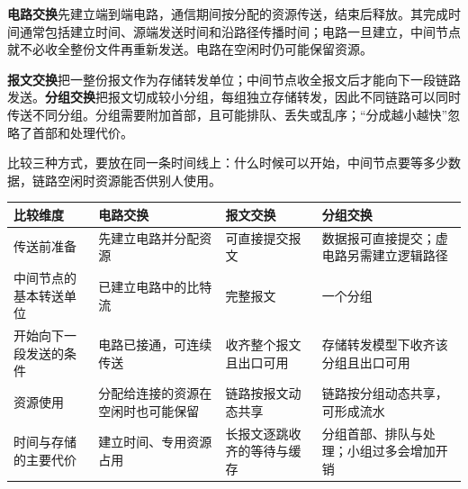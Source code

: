 \textbf{电路交换}先建立端到端电路，通信期间按分配的资源传送，结束后释放。其完成时间通常包括建立时间、源端发送时间和沿路径传播时间；电路一旦建立，中间节点就不必收全整份文件再重新发送。电路在空闲时仍可能保留资源。

\textbf{报文交换}把一整份报文作为存储转发单位；中间节点收全报文后才能向下一段链路发送。\textbf{分组交换}把报文切成较小分组，每组独立存储转发，因此不同链路可以同时传送不同分组。分组需要附加首部，且可能排队、丢失或乱序；``分成越小越快''忽略了首部和处理代价。

比较三种方式，要放在同一条时间线上：什么时候可以开始，中间节点要等多少数据，链路空闲时资源能否供别人使用。

\begin{wideblock}

\par\medskip\noindent\begin{minipage}{\linewidth}\fontsize{9.3}{12}\selectfont\begin{tabularx}{\linewidth}{@{}YYYY@{}}
\toprule\noalign{}
\begin{minipage}[b]{\linewidth}\raggedright
比较维度
\end{minipage} & \begin{minipage}[b]{\linewidth}\raggedright
电路交换
\end{minipage} & \begin{minipage}[b]{\linewidth}\raggedright
报文交换
\end{minipage} & \begin{minipage}[b]{\linewidth}\raggedright
分组交换
\end{minipage} \\
\midrule\noalign{}


传送前准备 & 先建立电路并分配资源 & 可直接提交报文 & 数据报可直接提交；虚电路另需建立逻辑路径 \\
中间节点的基本转送单位 & 已建立电路中的比特流 & 完整报文 & 一个分组 \\
开始向下一段发送的条件 & 电路已接通，可连续传送 & 收齐整个报文且出口可用 & 存储转发模型下收齐该分组且出口可用 \\
资源使用 & 分配给连接的资源在空闲时也可能保留 & 链路按报文动态共享 & 链路按分组动态共享，可形成流水 \\
时间与存储的主要代价 & 建立时间、专用资源占用 & 长报文逐跳收齐的等待与缓存 & 分组首部、排队与处理；小组过多会增加开销 \\
\bottomrule\end{tabularx}
\end{minipage}\par\medskip

\end{wideblock}

